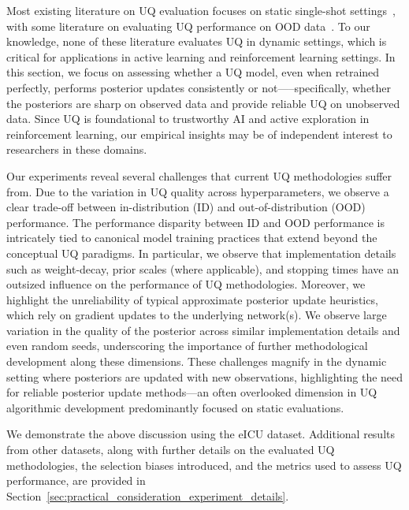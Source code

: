 Most existing literature on UQ evaluation  focuses on static single-shot settings~\citep{OsbandWenAsDwIbLuRo23}, with some literature on evaluating UQ performance on OOD data~\citep{OvadiaFeReNa19,Nadoal21}. To our knowledge, none of these literature evaluates UQ in dynamic settings, which is critical for applications in active learning and reinforcement learning settings. 
In this section,  we focus on assessing whether a UQ model, 
even  
when retrained perfectly, performs posterior updates consistently or not—--specifically, whether the posteriors are sharp on observed data and provide reliable UQ on unobserved data. 
Since UQ is foundational to trustworthy AI and active exploration in reinforcement learning, our empirical insights may be of independent interest to researchers in these domains.  

Our experiments reveal several challenges that current UQ methodologies suffer from. Due to the variation in UQ quality across hyperparameters, we observe a clear trade-off between in-distribution (ID) and out-of-distribution (OOD) performance. 
The performance disparity between ID and OOD performance is intricately tied to canonical model training practices that extend beyond the conceptual UQ paradigms. In particular, we observe that implementation details such as weight-decay, prior scales (where applicable), and stopping times have an outsized influence on the performance of UQ methodologies. Moreover, we highlight
the unreliability of typical approximate posterior update heuristics,
which rely on gradient updates to the underlying network(s). 
We observe large variation in the quality of the posterior across similar implementation details and even random seeds,
underscoring the importance of further methodological development along these dimensions. 
These challenges magnify in the dynamic setting where posteriors are updated with new observations, highlighting the need for reliable posterior update methods---an often  overlooked dimension in UQ algorithmic development predominantly focused on static evaluations.  

We demonstrate the above discussion using the eICU dataset. Additional results from other datasets, along with further details on the evaluated UQ methodologies, the selection biases introduced, and the metrics used to assess UQ performance, are provided in
Section~\ref{sec:practical_consideration_experiment_details}.
 
